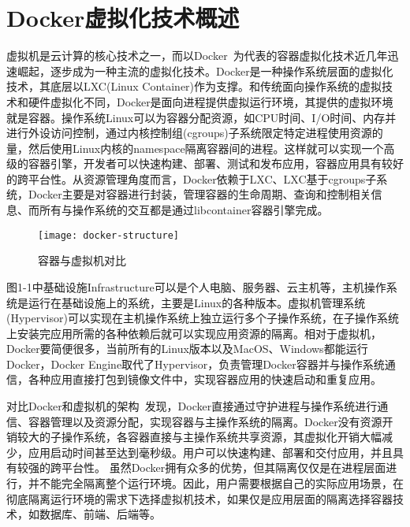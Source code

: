 \section{Docker虚拟化技术概述}
虚拟机是云计算的核心技术之一，而以Docker~\cite{2015Docker}为代表的容器虚拟化技术近几年迅速崛起，逐步成为一种主流的虚拟化技术。Docker是一种操作系统层面的虚拟化技术，其底层以LXC(Linux Container)作为支撑。和传统面向操作系统的虚拟技术和硬件虚拟化不同，Docker是面向进程提供虚拟运行环境，其提供的虚拟环境就是容器。操作系统Linux可以为容器分配资源，如CPU时间、I/O时间、内存并进行外设访问控制，通过内核控制组(cgroups)子系统限定特定进程使用资源的量，然后使用Linux内核的namespace隔离容器间的进程。这样就可以实现一个高级的容器引擎，开发者可以快速构建、部署、测试和发布应用，容器应用具有较好的跨平台性。从资源管理角度而言，Docker依赖于LXC、LXC基于cgroups子系统，Docker主要是对容器进行封装，管理容器的生命周期、查询和控制相关信息、而所有与操作系统的交互都是通过libcontainer容器引擎完成。
\begin{figure}[H] %
	\centering
	\texttt{[image: docker-structure]}
	\caption{容器与虚拟机对比~\cite{Barik2017Performance}}
\end{figure}
图1-1中基础设施Infrastructure可以是个人电脑、服务器、云主机等，主机操作系统是运行在基础设施上的系统，主要是Linux的各种版本。虚拟机管理系统(Hypervisor)可以实现在主机操作系统上独立运行多个子操作系统，在子操作系统上安装完应用所需的各种依赖后就可以实现应用资源的隔离。相对于虚拟机，Docker要简便很多，当前所有的Linux版本以及MacOS、Windows都能运行Docker，Docker Engine取代了Hypervisor，负责管理Docker容器并与操作系统通信，各种应用直接打包到镜像文件中，实现容器应用的快速启动和重复应用。

对比Docker和虚拟机的架构~\cite{Barik2017Performance, Felter2007An}发现，Docker直接通过守护进程与操作系统进行通信、容器管理以及资源分配，实现容器与主操作系统的隔离。Docker没有资源开销较大的子操作系统，各容器直接与主操作系统共享资源，其虚拟化开销大幅减少，应用启动时间甚至达到毫秒级。用户可以快速构建、部署和交付应用，并且具有较强的跨平台性。
虽然Docker拥有众多的优势，但其隔离仅仅是在进程层面进行，并不能完全隔离整个运行环境。因此，用户需要根据自己的实际应用场景，在彻底隔离运行环境的需求下选择虚拟机技术，如果仅是应用层面的隔离选择容器技术，如数据库、前端、后端等。

